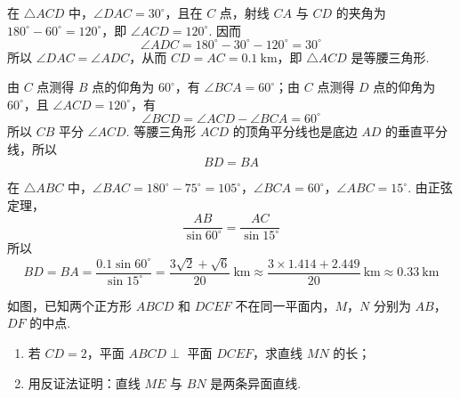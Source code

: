 \begin{solution}
在 \(\triangle ACD\) 中，\(\angle DAC=30^{\circ}\)，且在 \(C\) 点，射线 \(CA\) 与 \(CD\) 的夹角为 \(180^{\circ}-60^{\circ}=120^{\circ}\)，即 \(\angle ACD=120^{\circ}\). 因而
\[
\angle ADC=180^{\circ}-30^{\circ}-120^{\circ}=30^{\circ}
\]
所以 \(\angle DAC=\angle ADC\)，从而 \(CD=AC=0.1\mathrm{~km}\)，即 \(\triangle ACD\) 是等腰三角形.

由 \(C\) 点测得 \(B\) 点的仰角为 \(60^{\circ}\)，有 \(\angle BCA=60^{\circ}\)；由 \(C\) 点测得 \(D\) 点的仰角为 \(60^{\circ}\)，且 \(\angle ACD=120^{\circ}\)，有
\[
\angle BCD=\angle ACD-\angle BCA=60^{\circ}
\]
所以 \(CB\) 平分 \(\angle ACD\). 等腰三角形 \(ACD\) 的顶角平分线也是底边 \(AD\) 的垂直平分线，所以
\[
BD=BA
\]

在 \(\triangle ABC\) 中，\(\angle BAC=180^{\circ}-75^{\circ}=105^{\circ}\)，\(\angle BCA=60^{\circ}\)，\(\angle ABC=15^{\circ}\).
由正弦定理，
\[
\frac{AB}{\sin60^{\circ}}=\frac{AC}{\sin15^{\circ}}
\]
所以
\[
BD=BA=\frac{0.1\sin60^{\circ}}{\sin15^{\circ}}
    =\frac{3\sqrt{2}+\sqrt{6}}{20}\mathrm{~km}
    \approx\frac{3\times1.414+2.449}{20}\mathrm{~km}
    \approx0.33\mathrm{~km}
\]
\end{solution}

\begin{problem}
如图，已知两个正方形 \(ABCD\) 和 \(DCEF\) 不在同一平面内，\(M\)，\(N\) 分别为 \(AB\)，\(DF\) 的中点.
\begin{enumerate}
\item 若 \(CD = 2\)，平面 \(ABCD \perp\) 平面 \(DCEF\)，求直线 \(MN\) 的长；
\item 用反证法证明：直线 \(ME\) 与 \(BN\) 是两条异面直线.
\end{enumerate}

\end{problem}

